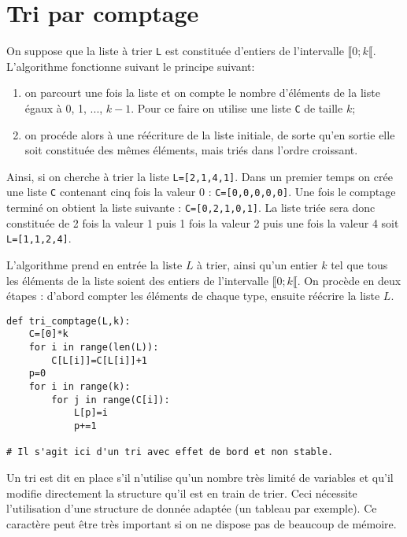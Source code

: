 
\section*{Tri par comptage}
On suppose que la liste à trier \lstinline{L} est constituée d’entiers de l’intervalle  $\llbracket 0; k \llbracket$. L’algorithme
fonctionne suivant le principe suivant: 
\begin{enumerate}
\item on parcourt une fois la liste et on compte le nombre d’éléments de
la liste égaux à 0, 1, ..., $k-1$. Pour ce faire on utilise une liste \lstinline{C} de taille $k$;
\item on procéde alors à une réécriture de la liste initiale, de sorte qu’en sortie elle soit constituée des mêmes éléments, mais triés dans l’ordre
croissant.
\end{enumerate}

Ainsi, si on cherche à trier la liste \lstinline{L=[2,1,4,1]}. Dans un premier temps on crée une liste \lstinline{C} contenant cinq fois la valeur 0 : \lstinline{C=[0,0,0,0,0]}. Une fois le comptage terminé on obtient la liste suivante : \lstinline{C=[0,2,1,0,1]}. La liste triée sera donc constituée de 2 fois la valeur 1 puis 1 fois la valeur 2 puis une fois la valeur 4 soit \lstinline{L=[1,1,2,4]}.



L’algorithme prend en entrée la liste $L$ à trier, ainsi qu’un entier $k$ tel que tous les éléments de la
liste soient des entiers de l’intervalle $\llbracket 0; k \llbracket$. On procède en deux étapes : d’abord compter les éléments de chaque type,
ensuite réécrire la liste $L$.

\ifprof
\begin{corrige}
\begin{lstlisting}
def tri_comptage(L,k):
    C=[0]*k
    for i in range(len(L)):
        C[L[i]]=C[L[i]]+1
    p=0
    for i in range(k):
        for j in range(C[i]):
            L[p]=i
            p+=1
            
# Il s'agit ici d'un tri avec effet de bord et non stable. 
\end{lstlisting}
\end{corrige}
\else
\fi
{}
\ifprof
\begin{corrige}
\end{corrige}
\else
\fi
\begin{defi}
Un tri est dit en place s'il n'utilise qu'un nombre très limité de variables et qu’il modifie directement la structure qu’il est en train de trier. Ceci nécessite l’utilisation d'une structure de donnée adaptée (un tableau par exemple). Ce caractère peut être très important si on ne dispose pas de beaucoup de mémoire.
\end{defi}

